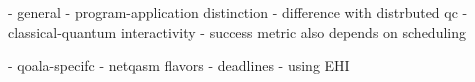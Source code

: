 - general
  - program-application distinction
  - difference with distrbuted qc
  - classical-quantum interactivity
  - success metric also depends on scheduling

- qoala-specifc
  - netqasm flavors
  - deadlines
  - using EHI






